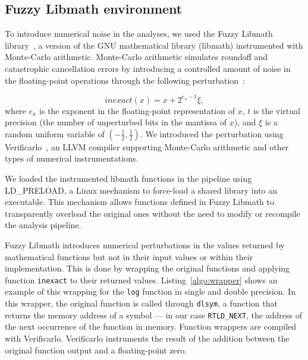 \documentclass[conference]{IEEEtran}
\begin{document}
\subsection{Fuzzy Libmath environment}

To introduce numerical noise in the analyses, we used
the Fuzzy Libmath library~\cite{salari2021accurate}, a version of the GNU
mathematical library (libmath) instrumented with Monte-Carlo arithmetic.
Monte-Carlo arithmetic simulates roundoff and catastrophic cancellation
errors by introducing a controlled amount of noise in the floating-point
operations through the following perturbation~\cite{Parker1997-qq}:

\begin{equation} \label{eq:mca_inexact}
  inexact(x) = x + 2^{e_x-t}\xi,
\end{equation}
where $e_x$ is the exponent in the floating-point representation of $x$,
$t$ is the virtual precision (the number of unperturbed bits in the
mantissa of $x$), and $\xi$ is a random uniform variable of
$(-\frac{1}{2}, \frac{1}{2})$. We introduced the perturbation using 
Verificarlo~\cite{denis2015verificarlo}, an LLVM compiler supporting Monte-Carlo 
arithmetic and other types of numerical instrumentations.

We loaded the instrumented libmath functions in the pipeline using
LD\_PRELOAD, a Linux mechanism to force-load a shared library into an
executable. This mechanism allows functions defined in Fuzzy Libmath to transparently
overload the original ones without the need to modify or recompile the
analysis pipeline.

Fuzzy Libmath introduces numerical perturbations in the values returned by
mathematical functions but not in their input values or within their
implementation. This is done by wrapping the original functions and
applying function \texttt{inexact} to their returned values.
Listing~\ref{algo:wrapper} shows an example of this wrapping for the
\texttt{log} function in single and double precision. In this wrapper, the
original function is called through \texttt{dlsym}, a function that returns
the memory address of a symbol --- in our case \texttt{RTLD\_NEXT}, the
address of the next occurrence of the function in memory. Function wrappers
are compiled with Verificarlo. Verificarlo instruments the result of the
addition between the original function output and a floating-point zero.


\end{document}
